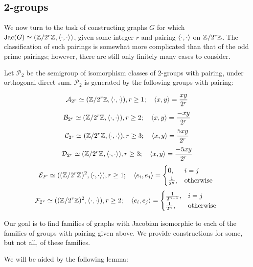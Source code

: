 \documentclass{amsart}
\begin{document}
\subsection{2-groups}

We now turn to the task of constructing graphs $G$ for which $\operatorname{Jac}(G)
\simeq (\mathbb{Z}/2^r\mathbb{Z}, \langle \cdot, \cdot \rangle)$, given some integer $r$ and
pairing $\langle \cdot, \cdot \rangle$ on $\mathbb{Z}/2^r\mathbb{Z}$. The classification of
such pairings is somewhat more complicated than that of the odd prime
pairings; however, there are still only finitely many cases to
consider.

\begin{prop}
  Let $\mathcal{P}_{2}$ be the semigroup of isomorphism classes of
  2-groups with pairing, under orthogonal direct
  sum. $\mathcal{P}_{2}$ is generated by the following groups with pairing:

  \[ \mathcal{A}_{2^{r}} \simeq (\mathbb{Z}/2^r\mathbb{Z}, \langle \cdot, \cdot \rangle), r \ge 1; \quad
  \langle x, y \rangle = \frac{xy}{2^r}\]
  \[ \mathcal{B}_{2^{r}} \simeq (\mathbb{Z}/2^r\mathbb{Z}, \langle \cdot, \cdot \rangle), r \ge 2; \quad
  \langle x, y \rangle = \frac{-xy}{2^r}\]
  \[ \mathcal{C}_{2^{r}} \simeq (\mathbb{Z}/2^r\mathbb{Z}, \langle \cdot, \cdot \rangle), r \ge 3; \quad
  \langle x, y \rangle = \frac{5xy}{2^r}\]
  \[ \mathcal{D}_{2^{r}} \simeq (\mathbb{Z}/2^r\mathbb{Z}, \langle \cdot, \cdot \rangle), r \ge 3; \quad
  \langle x, y \rangle = \frac{-5xy}{2^r}\]
  \[ \mathcal{E}_{2^{r}} \simeq ((\mathbb{Z}/2^r\mathbb{Z})^2, \langle \cdot, \cdot \rangle), r \ge 1; \quad
  \langle e_i, e_j \rangle = 
  \begin{cases}
    0, & i = j\\
    \frac{1}{2^{n}}, & \textrm{otherwise }
  \end{cases}
   \]
   \[ \mathcal{F}_{2^{r}} \simeq ((\mathbb{Z}/2^r\mathbb{Z})^2, \langle \cdot, \cdot \rangle), r \ge 2; \quad
   \langle e_i, e_j \rangle = 
   \begin{cases}
     \frac{1}{2^{n-1}}, & i = j\\
     \frac{1}{2^{n}}, & \textrm{otherwise }
   \end{cases}
   \]   
 \end{prop}

 Our goal is to find families of graphs with Jacobian isomorphic to
 each of the families of groups with pairing given above. We provide
 constructions for some, but not all, of these families. 

 We will be aided by the following lemma:
\end{document}
